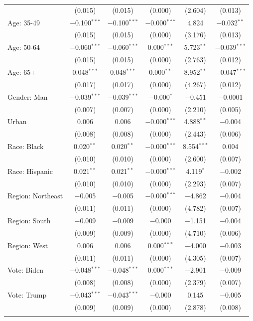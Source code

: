\documentclass[12pt,english]{article}
\begin{document}
\begin{table}[h]
{{\begin{tabular}{@{\extracolsep{5pt}}lccccc}
  & (0.015) & (0.015) & (0.000) & (2.604) & (0.013) \\ 
  Age: 35\mbox{-}49 & $-$0.100$^{***}$ & $-$0.100$^{***}$ & $-$0.000$^{***}$ & 4.824 & $-$0.032$^{**}$ \\ 
  & (0.015) & (0.015) & (0.000) & (3.176) & (0.013) \\ 
  Age: 50\mbox{-}64 & $-$0.060$^{***}$ & $-$0.060$^{***}$ & 0.000$^{***}$ & 5.723$^{**}$ & $-$0.039$^{***}$ \\ 
  & (0.015) & (0.015) & (0.000) & (2.763) & (0.012) \\ 
  Age: 65+ & 0.048$^{***}$ & 0.048$^{***}$ & 0.000$^{**}$ & 8.952$^{**}$ & $-$0.047$^{***}$ \\ 
  & (0.017) & (0.017) & (0.000) & (4.267) & (0.012) \\ 
  Gender: Man & $-$0.039$^{***}$ & $-$0.039$^{***}$ & $-$0.000$^{*}$ & $-$0.451 & $-$0.0001 \\ 
  & (0.007) & (0.007) & (0.000) & (2.210) & (0.005) \\ 
  Urban & 0.006 & 0.006 & $-$0.000$^{***}$ & 4.888$^{**}$ & $-$0.004 \\ 
  & (0.008) & (0.008) & (0.000) & (2.443) & (0.006) \\ 
  Race: Black & 0.020$^{**}$ & 0.020$^{**}$ & $-$0.000$^{***}$ & 8.554$^{***}$ & 0.004 \\ 
  & (0.010) & (0.010) & (0.000) & (2.600) & (0.007) \\ 
  Race: Hispanic & 0.021$^{**}$ & 0.021$^{**}$ & $-$0.000$^{***}$ & 4.119$^{*}$ & $-$0.002 \\ 
  & (0.010) & (0.010) & (0.000) & (2.293) & (0.007) \\ 
  Region: Northeast & $-$0.005 & $-$0.005 & $-$0.000$^{***}$ & $-$4.862 & $-$0.004 \\ 
  & (0.011) & (0.011) & (0.000) & (4.782) & (0.007) \\ 
  Region: South & $-$0.009 & $-$0.009 & $-$0.000 & $-$1.151 & $-$0.004 \\ 
  & (0.009) & (0.009) & (0.000) & (4.710) & (0.006) \\ 
  Region: West & 0.006 & 0.006 & 0.000$^{***}$ & $-$4.000 & $-$0.003 \\ 
  & (0.011) & (0.011) & (0.000) & (4.305) & (0.007) \\ 
  Vote: Biden & $-$0.048$^{***}$ & $-$0.048$^{***}$ & 0.000$^{***}$ & $-$2.901 & $-$0.009 \\ 
  & (0.008) & (0.008) & (0.000) & (2.379) & (0.007) \\ 
  Vote: Trump & $-$0.043$^{***}$ & $-$0.043$^{***}$ & $-$0.000 & 0.145 & $-$0.005 \\ 
  & (0.009) & (0.009) & (0.000) & (2.878) & (0.008) \\ 
 \hline \\[-1.8ex] 


\end{tabular}}}
\end{table}
\end{document}
